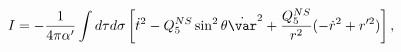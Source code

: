 \begin{equation}
I = -\frac{1}{4\pi\alpha'}\int d\tau d\sigma \left[ \dot{t}^2 -
Q_5^{NS}\sin^2\theta\dot{\var}^2 + \frac{Q_5^{NS}}{r^2}
( -\dot{r}^2 + r'^2 ) \right],
\end{equation}

